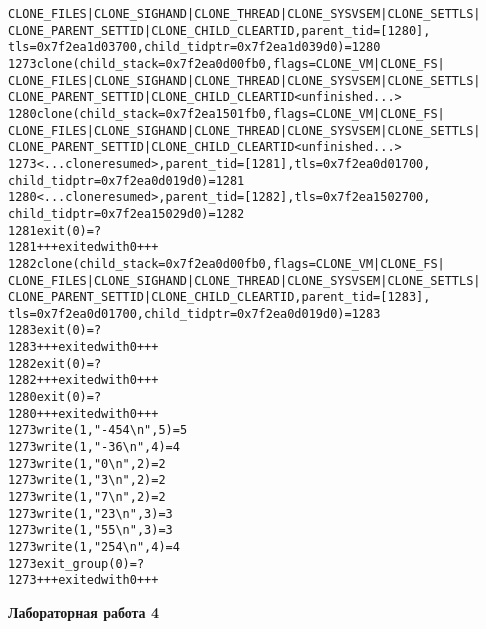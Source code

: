 \documentclass[pdf, unicode, 12pt, a4paper,oneside,fleqn]{article}
\begin{document}
\begin{alltt}
CLONE_FILES|CLONE_SIGHAND|CLONE_THREAD|CLONE_SYSVSEM|CLONE_SETTLS|
CLONE_PARENT_SETTID|CLONE_CHILD_CLEARTID, parent_tid=[1280], 
tls=0x7f2ea1d03700, child_tidptr=0x7f2ea1d039d0) = 1280
1273  clone(child_stack=0x7f2ea0d00fb0, flags=CLONE_VM|CLONE_FS|
CLONE_FILES|CLONE_SIGHAND|CLONE_THREAD|CLONE_SYSVSEM|CLONE_SETTLS|
CLONE_PARENT_SETTID|CLONE_CHILD_CLEARTID <unfinished ...>
1280  clone(child_stack=0x7f2ea1501fb0, flags=CLONE_VM|CLONE_FS|
CLONE_FILES|CLONE_SIGHAND|CLONE_THREAD|CLONE_SYSVSEM|CLONE_SETTLS|
CLONE_PARENT_SETTID|CLONE_CHILD_CLEARTID <unfinished ...>
1273  <... clone resumed>, parent_tid=[1281], tls=0x7f2ea0d01700, 
child_tidptr=0x7f2ea0d019d0) = 1281
1280  <... clone resumed>, parent_tid=[1282], tls=0x7f2ea1502700, 
child_tidptr=0x7f2ea15029d0) = 1282
1281  exit(0)                           = ?
1281  +++ exited with 0 +++
1282  clone(child_stack=0x7f2ea0d00fb0, flags=CLONE_VM|CLONE_FS|
CLONE_FILES|CLONE_SIGHAND|CLONE_THREAD|CLONE_SYSVSEM|CLONE_SETTLS|
CLONE_PARENT_SETTID|CLONE_CHILD_CLEARTID, parent_tid=[1283], 
tls=0x7f2ea0d01700, child_tidptr=0x7f2ea0d019d0) = 1283
1283  exit(0)                           = ?
1283  +++ exited with 0 +++
1282  exit(0)                           = ?
1282  +++ exited with 0 +++
1280  exit(0)                           = ?
1280  +++ exited with 0 +++
1273  write(1, "-454\textbackslash{n}", 5)             = 5
1273  write(1, "-36\textbackslash{n}", 4)              = 4
1273  write(1, "0\textbackslash{n}", 2)                = 2
1273  write(1, "3\textbackslash{n}", 2)                = 2
1273  write(1, "7\textbackslash{n}", 2)                = 2
1273  write(1, "23\textbackslash{n}", 3)               = 3
1273  write(1, "55\textbackslash{n}", 3)               = 3
1273  write(1, "254\textbackslash{n}", 4)              = 4
1273  exit_group(0)                     = ?
1273  +++ exited with 0 +++
\end{alltt}

\pagebreak

{\large\textbf{Лабораторная работа 4}}
\end{document}
